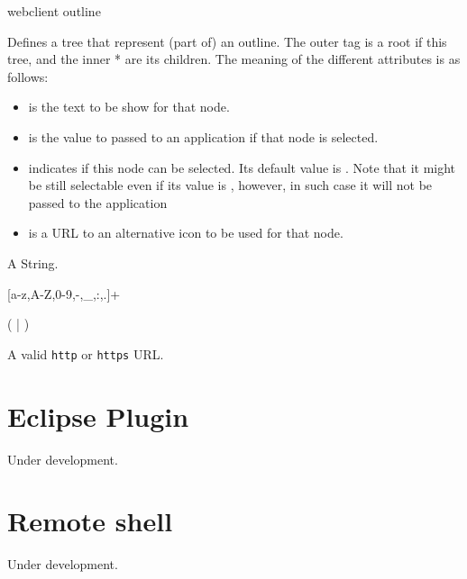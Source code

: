 \bigskip
\xmlstruct
{webclient}
{outline}
{%
%
  Defines a tree that represent (part of) an outline. The outer
   tag is a root if this tree, and the inner
  * are its children. The meaning of
  the different attributes is as follows:
%
\begin{itemize}
  \item {} is the text to be show for that node.
  \item {} is the value to passed to an application if that node is selected.
  \item {} indicates if this node can be
    selected. Its default value is . Note that it
    might be still selectable even if its value is
    , however, in such case it will not be
    passed to the application
  \item {} is a URL to an alternative icon to be
    used for that node.
\end{itemize}
%
\bigskip
\noindent
{}

A String.

\bigskip
\noindent
{}

[a-z,A-Z,0-9,-,\_,:,.]+

\bigskip
\noindent
{}

(  |  )

\bigskip
\noindent
{}

A valid \texttt{http} or \texttt{https} URL.
}



\section{Eclipse Plugin}
\label{ch:clients:eclipse}

Under development. 

\section{Remote shell}
\label{ch:clients:shell}

Under development. 
